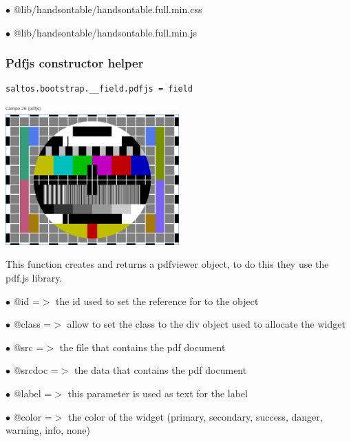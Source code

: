 \documentclass[a4paper]{article}
\begin{document}
\begin{compactitem}
\item[\color{myblue}$\bullet$] @lib/handsontable/handsontable.full.min.css
\item[\color{myblue}$\bullet$] @lib/handsontable/handsontable.full.min.js
\end{compactitem}

\hypertarget{toc74}{}
\subsubsection{Pdfjs constructor helper}

\begin{lstlisting}
saltos.bootstrap.__field.pdfjs = field
\end{lstlisting}

\begin{center}\includegraphics[width=0.5\textwidth]{../ujest/snaps/test-bootstrap-js-bootstrap-campo-26-pdfjs-1-snap.png}\end{center}

This function creates and returns a pdfviewer object, to do this they use the pdf.js library.

\begin{compactitem}
\item[\color{myblue}$\bullet$] @id     =$>$ the id used to set the reference for to the object
\item[\color{myblue}$\bullet$] @class  =$>$ allow to set the class to the div object used to allocate the widget
\item[\color{myblue}$\bullet$] @src    =$>$ the file that contains the pdf document
\item[\color{myblue}$\bullet$] @srcdoc =$>$ the data that contains the pdf document
\item[\color{myblue}$\bullet$] @label  =$>$ this parameter is used as text for the label
\item[\color{myblue}$\bullet$] @color  =$>$ the color of the widget (primary, secondary, success, danger, warning, info, none)
\end{compactitem}
\end{document}
